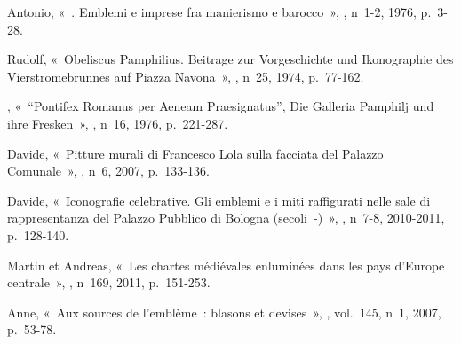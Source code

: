 \begin{teiElement}[name={TEI},change={commons\_edition}]
\begin{teiElement}[name={text},type={book},xmlid={book}]
\begin{teiElement}[name={group},type={book},xmlid={book-001}]
\begin{teiElement}[name={group},type={bibliography},data-page-title={Sources et bibliographie},data-include-href={Ch14\_Source\_bibliographie.xml},xmlid={bibliography-001}]
\begin{teiElement}[name={body}]
\begin{teiDiv}[type={section1},xmlid={div18}]
\begin{teiDiv}[type={section2},xmlid={div20}]
              \begin{teiBibl}[xmlid={bibl-483}]
 Antonio, « . Emblemi e imprese fra manierismo e barocco », , n 1-2, 1976, p. 3-28.
\end{teiBibl}
              \begin{teiBibl}[xmlid={bibl-484}]
 Rudolf, « Obeliscus Pamphilius. Beitrage zur Vorgeschichte und Ikonographie des Vierstromebrunnes auf Piazza Navona », , n 25, 1974, p. 77-162.
\end{teiBibl}
              \begin{teiBibl}[xmlid={bibl-485}]
, « “Pontifex Romanus per Aeneam Praesignatus”, Die Galleria Pamphilj und ihre Fresken », , n 16, 1976, p. 221-287.
\end{teiBibl}
              \begin{teiBibl}[xmlid={bibl-486}]
 Davide, « Pitture murali di Francesco Lola sulla facciata del Palazzo Comunale », , n 6, 2007, p. 133-136.
\end{teiBibl}
              \begin{teiBibl}[xmlid={bibl-487}]
 Davide, « Iconografie celebrative. Gli emblemi e i miti raffigurati nelle sale di rappresentanza del Palazzo Pubblico di Bologna (secoli -) », , n 7-8, 2010-2011, p. 128-140.
\end{teiBibl}
              \begin{teiBibl}[xmlid={bibl-488}]
 Martin et  Andreas, « Les chartes médiévales enluminées dans les pays d’Europe centrale », , n 169, 2011, p. 151-253.
\end{teiBibl}
              \begin{teiBibl}[xmlid={bibl-489}]
 Anne, « Aux sources de l’emblème : blasons et devises », , vol. 145, n 1, 2007, p. 53-78.

\end{teiBibl}
\end{teiDiv}
\end{teiDiv}
\end{teiElement}
\end{teiElement}
\end{teiElement}
\end{teiElement}
\end{teiElement}

